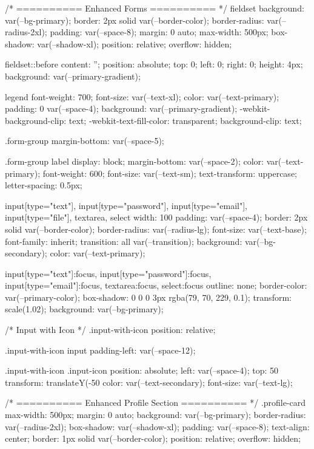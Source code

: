 /* ========== Enhanced Forms ========== */
fieldset {
  background: var(--bg-primary);
  border: 2px solid var(--border-color);
  border-radius: var(--radius-2xl);
  padding: var(--space-8);
  margin: 0 auto;
  max-width: 500px;
  box-shadow: var(--shadow-xl);
  position: relative;
  overflow: hidden;
}

fieldset::before {
  content: '';
  position: absolute;
  top: 0;
  left: 0;
  right: 0;
  height: 4px;
  background: var(--primary-gradient);
}

legend {
  font-weight: 700;
  font-size: var(--text-xl);
  color: var(--text-primary);
  padding: 0 var(--space-4);
  background: var(--primary-gradient);
  -webkit-background-clip: text;
  -webkit-text-fill-color: transparent;
  background-clip: text;
}

.form-group {
  margin-bottom: var(--space-5);
}

.form-group label {
  display: block;
  margin-bottom: var(--space-2);
  color: var(--text-primary);
  font-weight: 600;
  font-size: var(--text-sm);
  text-transform: uppercase;
  letter-spacing: 0.5px;
}

input[type="text"],
input[type="password"],
input[type="email"],
input[type="file"],
textarea,
select {
  width: 100%
  padding: var(--space-4);
  border: 2px solid var(--border-color);
  border-radius: var(--radius-lg);
  font-size: var(--text-base);
  font-family: inherit;
  transition: all var(--transition);
  background: var(--bg-secondary);
  color: var(--text-primary);
}

input[type="text"]:focus,
input[type="password"]:focus,
input[type="email"]:focus,
textarea:focus,
select:focus {
  outline: none;
  border-color: var(--primary-color);
  box-shadow: 0 0 0 3px rgba(79, 70, 229, 0.1);
  transform: scale(1.02);
  background: var(--bg-primary);
}

/* Input with Icon */
.input-with-icon {
  position: relative;
}

.input-with-icon input {
  padding-left: var(--space-12);
}

.input-with-icon .input-icon {
  position: absolute;
  left: var(--space-4);
  top: 50%
  transform: translateY(-50%
  color: var(--text-secondary);
  font-size: var(--text-lg);
}

/* ========== Enhanced Profile Section ========== */
.profile-card {
  max-width: 500px;
  margin: 0 auto;
  background: var(--bg-primary);
  border-radius: var(--radius-2xl);
  box-shadow: var(--shadow-xl);
  padding: var(--space-8);
  text-align: center;
  border: 1px solid var(--border-color);
  position: relative;
  overflow: hidden;
}

